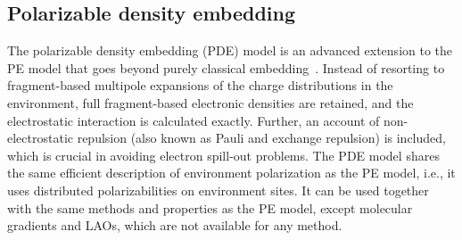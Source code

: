 \subsection{Polarizable density embedding}\label{subsec:pde}
The polarizable density embedding (PDE) model is an advanced extension to the PE model
that goes beyond purely classical embedding~\cite{pde1,pde2,pde3}.
Instead of resorting to fragment-based multipole expansions of the charge distributions
in the environment, full fragment-based electronic densities are retained, and the
electrostatic interaction is calculated exactly.
Further, an account of non-electrostatic repulsion (also known as Pauli and
exchange repulsion) is included, which is crucial in avoiding electron
spill-out problems.
The PDE model shares the same efficient description of environment polarization as
the PE model, i.e., it uses distributed polarizabilities on environment sites.
It can be used together with the same methods and properties as the PE model,
except molecular gradients and LAOs, which are not available for any method.

